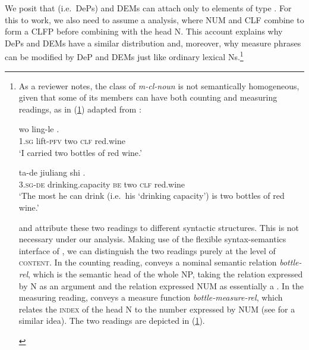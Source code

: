 \documentclass[output=paper,colorlinks,citecolor=brown]{langscibook}
\begin{document}
We posit that  (i.e.\ DePs) and DEMs can attach only to elements of type . For this to work, we also need to assume a  analysis, where NUM and CLF combine to form a CLFP before combining with the head N. This account explains why DePs and DEMs have a similar distribution and, moreover, why measure  phrases can  be modified by DeP and DEMs just like ordinary lexical Ns.\footnote{As a reviewer notes, the class of \textit{m-cl-noun} is not semantically homogeneous, given that some of its members can have both counting and measuring readings, as in (\ref{ex:c&m:deng}) adapted from \citet[135]{Li13a}:
	
\settowidth{}  	
\ea \label{ex:c&m:deng}	
\ea \label{ex:coungting:deng}	
\gll wo ling-le   .\\
1.\textsc{sg} lift-\textsc{pfv} two \textsc{clf} red.wine\\ 
\glt `I carried two bottles of red wine.'

\ex 
\gll ta-de jiuliang shi   .\\
3.\textsc{sg}-\textsc{de} drinking.capacity \textsc{be} two \textsc{clf} red.wine\\
\glt `The most he can drink (i.e.\ his `drinking capacity') is two bottles of red wine.'%
\z\z

 \noindent \citet{Li&Rothstein12} and \citet{Li13a} attribute these two readings to different syntactic structures. This is not necessary under our analysis. Making use of the flexible syntax-semantics interface of , we can distinguish the two readings purely at the level of \textsc{content}. In the counting reading,  conveys a nominal semantic relation \textit{bottle-rel}, which is the semantic head of the whole NP, taking the relation expressed by N as an argument and the relation expressed NUM as essentially a .  In the measuring reading,  conveys a measure function \textit{bottle-measure-rel}, which relates the \textsc{index} of the head N to the number expressed by NUM (see \citealt[400]{Krifka95a} for a similar idea). The two readings are depicted in (\ref{ping-sem:deng}).
 
\settowidth{}  
 \ea\label{ping-sem:deng}
 \ea %

}
\end{document}
